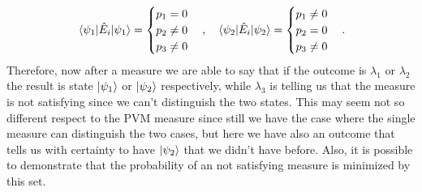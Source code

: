 \begin{align}
    &\ev{\hat{E}_i}{\psi_1} = \begin{cases}
        p_1 = 0\\
        p_2 \neq 0\\
        p_3 \neq 0
    \end{cases},
    &\ev{\hat{E}_i}{\psi_2} = \begin{cases}
        p_1 \neq 0\\
        p_2 = 0\\
        p_3 \neq 0
    \end{cases}.
\end{align}
Therefore, now after a measure we are able to say that if the outcome is $\lambda_1$ or $\lambda_2$ the result is state $\ket{\psi_1}$ or $\ket{\psi_2}$ respectively, while $\lambda_3$ is telling us that the measure is not satisfying since we can't distinguish the two states. This may seem not so different respect to the PVM measure since still we have the case where the single measure can distinguish the two cases, but here we have also an outcome that tells us with certainty to have $\ket{\psi_2}$ that we didn't have before. Also, it is possible to demonstrate that the probability of an not satisfying measure is minimized by this set.

